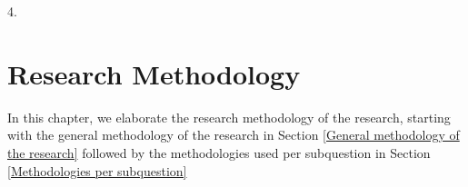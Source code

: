 \documentclass[12pt]{scrreprt}
\begin{document}
\begin{flushleft}
4. \textit{\sqfour}
\end{flushleft}

\chapter{Research Methodology}
\label{Research Methodology}
In this chapter, we elaborate the research methodology of the research, starting with the general methodology of the research in Section \ref{General methodology of the research} followed by the methodologies used per subquestion in Section \ref{Methodologies per subquestion}
\end{document}
